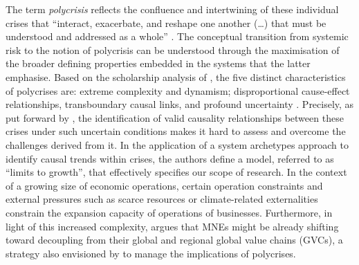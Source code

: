 \documentclass[12pt,a4paper]{article}
\begin{document}
The term \textit{polycrisis} reflects the confluence and intertwining of these individual crises that ``interact, exacerbate, and reshape one another (\ldots) that must be understood and addressed as a whole'' \citep{lawrence2022polycrisis}. The conceptual transition from systemic risk to the notion of polycrisis can be understood through the maximisation of the broader defining properties embedded in the systems that the latter emphasise. Based on the scholarship analysis of \citet{lawrence2022polycrisis}, the five distinct characteristics of polycrises are: extreme complexity and dynamism; disproportional cause-effect relationships, transboundary causal links, and profound uncertainty \citep{renn2022, renn2019, schweizer2019}. Precisely, as put forward by \citet{collste2025}, the identification of valid causality relationships between these crises under such uncertain conditions makes it hard to assess and overcome the challenges derived from it. In the application of a system archetypes approach to identify causal trends within crises, the authors define a model, referred to as ``limits to growth'', that effectively specifies our scope of research. In the context of a growing size of economic operations, certain operation constraints and external pressures such as scarce resources or climate-related externalities constrain the expansion capacity of operations of businesses. Furthermore, in light of this increased complexity, \citet{rapoza} argues that MNEs might be already shifting toward decoupling from their global and regional global value chains (GVCs), a strategy also envisioned by \citet{collste2025} to manage the implications of polycrises.
\end{document}
